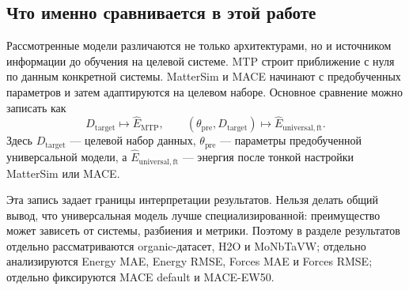 \subsection{Что именно сравнивается в этой работе}

Рассмотренные модели различаются не только архитектурами, но и источником информации до обучения на целевой системе. MTP строит приближение с нуля по данным конкретной системы. MatterSim и MACE начинают с предобученных параметров и затем адаптируются на целевом наборе. Основное сравнение можно записать как
\[
    D_{\mathrm{target}}
    \longmapsto
    \widehat{E}_{\mathrm{MTP}},
    \qquad
    (\theta_{\mathrm{pre}}, D_{\mathrm{target}})
    \longmapsto
    \widehat{E}_{\mathrm{universal,ft}}.
    \label{eq:comparison_strategies}
\]
Здесь \(D_{\mathrm{target}}\) — целевой набор данных, \(\theta_{\mathrm{pre}}\) — параметры предобученной универсальной модели, а \(\widehat{E}_{\mathrm{universal,ft}}\) — энергия после тонкой настройки MatterSim или MACE.

Эта запись задает границы интерпретации результатов. Нельзя делать общий вывод, что универсальная модель лучше специализированной: преимущество может зависеть от системы, разбиения и метрики. Поэтому в разделе результатов отдельно рассматриваются organic-датасет, H2O и MoNbTaVW; отдельно анализируются Energy MAE, Energy RMSE, Forces MAE и Forces RMSE; отдельно фиксируются MACE default и MACE-EW50.
